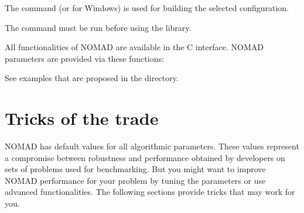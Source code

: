 \documentclass[letterpaper,10pt,english]{sphinxmanual}
\begin{document}
\sphinxAtStartPar
The command  (or  for Windows) is used for building the selected configuration.

\sphinxAtStartPar
The command  must be run before using the library.

\sphinxAtStartPar
All functionalities of NOMAD are available in the C interface.
NOMAD parameters are provided via these functions:

\begin{sphinxVerbatim}[commandchars=\\\{\}]
\end{sphinxVerbatim}

\sphinxAtStartPar
See examples that are proposed in the  directory.


\chapter{Tricks of the trade}
\label{\detokenize{TricksOfTheTrade:tricks-of-the-trade}}\label{\detokenize{TricksOfTheTrade:id1}}\label{\detokenize{TricksOfTheTrade::doc}}
\sphinxAtStartPar
NOMAD has default values for all algorithmic parameters. These values represent a compromise between robustness and performance obtained by developers on sets of problems used for benchmarking. But you might want to improve NOMAD performance for your problem by tuning the parameters or use advanced functionalities. The following sections provide tricks that may work for you.
\end{document}

